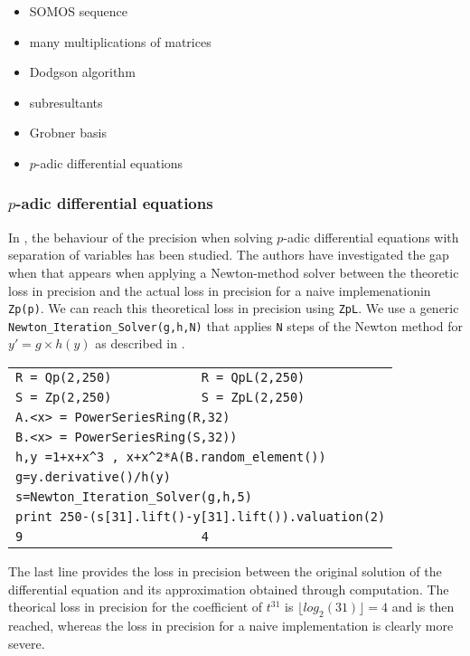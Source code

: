 \documentclass[sigconf]{acmart}
\theoremstyle{definition}
\begin{document}
\begin{itemize}
\item SOMOS sequence
\item many multiplications of matrices
\item Dodgson algorithm
\item subresultants
\item Grobner basis
\item $p$-adic differential equations
\end{itemize}

\subsubsection{$p$-adic differential equations}


In \cite{LV16}, the behaviour of the precision when solving
$p$-adic differential equations with separation of 
variables has been studied.
The authors have investigated the gap when that appears
when applying a Newton-method solver between
the theoretic loss in precision and the 
actual loss in precision for a naive implemenationin \verb?Zp(p)?.
We can reach this theoretical loss in precision using \verb?ZpL?.
We use a generic \verb?Newton_Iteration_Solver(g,h,N)?
that applies \verb?N? steps of the Newton method for 
$y'=g \times h(y)$ as described in \citep{LV16}. 

\begin{tabular}{|l|l|}
\verb?R = Qp(2,250)? & \verb?R = QpL(2,250)? \\
\verb?S = Zp(2,250)? & \verb?S = ZpL(2,250)? \\
\multicolumn{2}{|l|}{\tt A.<x> = PowerSeriesRing(R,32) } \\
\multicolumn{2}{|l|}{\tt B.<x> = PowerSeriesRing(S,32)) } \\
\multicolumn{2}{|l|}{\tt h,y =1+x+x\^{}3 , x+x\^{}2*A(B.random\_element()) } \\
\multicolumn{2}{|l|}{\tt g=y.derivative()/h(y) } \\
\multicolumn{2}{|l|}{\tt s=Newton\_Iteration\_Solver(g,h,5)} \\
\multicolumn{2}{|l|}{\tt print 250-(s[31].lift()-y[31].lift()).valuation(2)} \\
\hfill\verb?9? & \hfill\verb?4? \\
\end{tabular}
The last line provides the loss in precision between the
original solution of the differential equation and its approximation
obtained through computation.
The theorical loss in precision for the coefficient of $t^{31}$
is $\lfloor log_2 (31)\rfloor=4$ and is then reached, whereas the
loss in precision for a naive implementation is clearly more severe.
\end{document}

